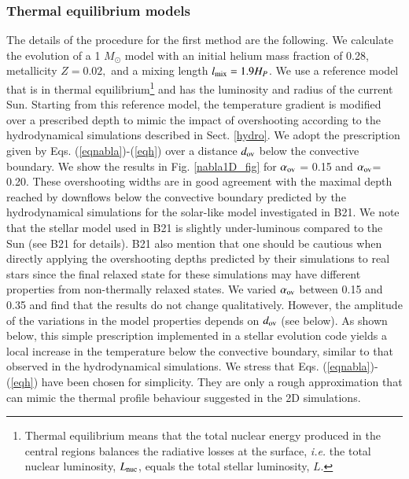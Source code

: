 \documentclass[traditabstract]{aa}
\newcommand{\3}{\ss}
\def\msol{M_\odot}
\newcommand{\cp}{\citep}
\begin{document}
{%




\subsubsection{Thermal equilibrium models}
\label{thermaleq}

The details of the procedure for the first method are the following.
We calculate the evolution of  a 1 $\msol$ model   with an initial helium mass fraction of 0.28, metallicity $Z=0.02,$ and a mixing length $l_{\rm mix} = 1.9 H_P$. 
We use a reference model that is in thermal equilibrium\footnote{Thermal equilibrium means that the total nuclear energy produced in the central regions balances the radiative losses at the surface, {\it i.e.} the total nuclear luminosity, $L_{\rm nuc}$, equals the total stellar luminosity, $L$.} and has the luminosity and radius of the current Sun. 
Starting from this reference model, the temperature gradient is modified over a prescribed depth to mimic the impact of overshooting according to the hydrodynamical simulations described in Sect. \ref{hydro}.
We adopt the prescription given by Eqs. (\ref{eqnabla})-(\ref{eqh}) over a distance $d_{\rm ov}$ below the convective boundary.
We show the results in Fig. \ref{nabla1D_fig} for $\alpha_{\rm ov}$ = 0.15 and $\alpha_{\rm ov}$= 0.20. These overshooting widths are in good agreement with the maximal depth reached by downflows below the convective boundary predicted by the hydrodynamical simulations for the solar-like model investigated in B21. We note that the stellar model used in B21 is slightly under-luminous compared to the Sun (see B21 for details). B21 also mention that 
one should be cautious when directly applying the overshooting depths predicted by their simulations to real stars since the final relaxed state for these simulations may have different properties from non-thermally relaxed states. We varied $\alpha_{\rm ov}$ between 0.15 and 0.35 and find that the results do not change qualitatively. However, the amplitude of the variations in the model properties depends on  $d_{\rm ov}$ (see below).
As shown below, this simple prescription implemented in a stellar evolution code yields a local increase in the temperature below the convective boundary, similar to  that observed in the hydrodynamical simulations. We stress that  Eqs. (\ref{eqnabla})-(\ref{eqh}) have been chosen for simplicity. They are only a rough approximation that can mimic the thermal profile behaviour suggested in the 2D simulations.

}
\end{document}
